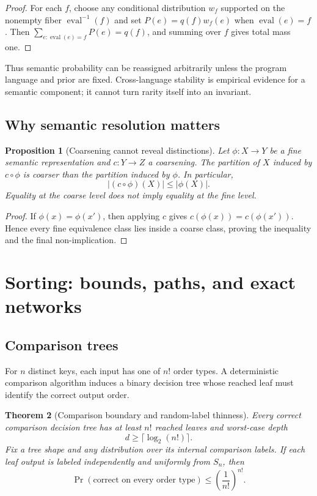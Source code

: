 \documentclass[10pt]{article}
\newtheorem{theorem}{Theorem}
\newtheorem{proposition}[theorem]{Proposition}
\theoremstyle{definition}
\begin{document}
\begin{proof}
For each $f$, choose any conditional distribution $w_f$ supported on the
nonempty fiber $\operatorname{eval}^{-1}(f)$ and set
$P(e)=q(f)w_f(e)$ when $\operatorname{eval}(e)=f$.  Then
$\sum_{e:\operatorname{eval}(e)=f}P(e)=q(f)$, and summing over $f$ gives total
mass one.
\end{proof}

Thus semantic probability can be reassigned arbitrarily unless the program
language and prior are fixed.  Cross-language stability is empirical evidence
for a semantic component; it cannot turn rarity itself into an invariant.

\subsection{Why semantic resolution matters}

\begin{proposition}[Coarsening cannot reveal distinctions]
Let $\phi:X\to Y$ be a fine semantic representation and $c:Y\to Z$ a
coarsening.  The partition of $X$ induced by $c\circ\phi$ is coarser than the
partition induced by $\phi$.  In particular,
\[
 |(c\circ\phi)(X)|\le |\phi(X)|.
 \tag{7}
\]
Equality at the coarse level does not imply equality at the fine level.
\end{proposition}

\begin{proof}
If $\phi(x)=\phi(x')$, then applying $c$ gives
$c(\phi(x))=c(\phi(x'))$.  Hence every fine equivalence class lies inside a
coarse class, proving the inequality and the final non-implication.
\end{proof}

\section{Sorting: bounds, paths, and exact networks}

\subsection{Comparison trees}

For $n$ distinct keys, each input has one of $n!$ order types.  A deterministic
comparison algorithm induces a binary decision tree whose reached leaf must
identify the correct output order.

\begin{theorem}[Comparison boundary and random-label thinness]
Every correct comparison decision tree has at least $n!$ reached leaves and
worst-case depth
\[
 d\ge\lceil\log_2(n!)\rceil.
 \tag{8}
\]
Fix a tree shape and any distribution over its internal comparison labels.  If
each leaf output is labeled independently and uniformly from $S_n$, then
\[
 \Pr(\text{correct on every order type})
 \le \left(\frac1{n!}\right)^{n!}.
 \tag{9}
\]
\end{theorem}
\end{document}
